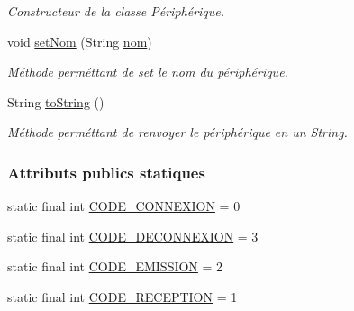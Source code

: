\begin{DoxyCompactItemize}
\begin{DoxyCompactList}\small\item\em Constructeur de la classe Périphérique. \end{DoxyCompactList}\item 
void \hyperlink{classcom_1_1lasalle_1_1io__trucks_1_1_peripherique_a1e61a36e2fb0d3665f1dcc41e5ea06b2}{set\+Nom} (String \hyperlink{classcom_1_1lasalle_1_1io__trucks_1_1_peripherique_a57ad735952307998eddf5277be95ec95}{nom})
\begin{DoxyCompactList}\small\item\em Méthode perméttant de set le nom du périphérique. \end{DoxyCompactList}\item 
String \hyperlink{classcom_1_1lasalle_1_1io__trucks_1_1_peripherique_a3ce69dc3b561771d428523f8df08cbc9}{to\+String} ()
\begin{DoxyCompactList}\small\item\em Méthode perméttant de renvoyer le périphérique en un String. \end{DoxyCompactList}\end{DoxyCompactItemize}
\subsubsection*{Attributs publics statiques}
\begin{DoxyCompactItemize}
\item 
static final int \hyperlink{classcom_1_1lasalle_1_1io__trucks_1_1_peripherique_a46ce17bdb3396e4aee94ea06a0bd8556}{C\+O\+D\+E\+\_\+\+C\+O\+N\+N\+E\+X\+I\+ON} = 0
\item 
static final int \hyperlink{classcom_1_1lasalle_1_1io__trucks_1_1_peripherique_a44d0841cdcad04f7d112cb30d12a60f0}{C\+O\+D\+E\+\_\+\+D\+E\+C\+O\+N\+N\+E\+X\+I\+ON} = 3
\item 
static final int \hyperlink{classcom_1_1lasalle_1_1io__trucks_1_1_peripherique_aad9e383353fd86265a2eeeac2d2c901f}{C\+O\+D\+E\+\_\+\+E\+M\+I\+S\+S\+I\+ON} = 2
\item 
static final int \hyperlink{classcom_1_1lasalle_1_1io__trucks_1_1_peripherique_a2abb4880d1dd4140379b3ff71cff8cf3}{C\+O\+D\+E\+\_\+\+R\+E\+C\+E\+P\+T\+I\+ON} = 1
\end{DoxyCompactItemize}

